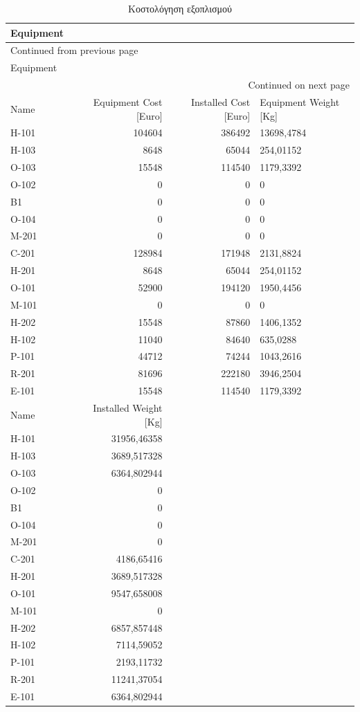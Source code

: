 \documentclass[11pt]{article}
\begin{document}
\begin{longtable}{lrrl}
\caption{Κοστολόγηση εξοπλισμού}
\\
Equipment &  &  & \\
\hline
\endfirsthead
\multicolumn{4}{l}{Continued from previous page} \\
\hline

Equipment &  &  &  \\

\hline
\endhead
\hline\multicolumn{4}{r}{Continued on next page} \\
\endfoot
\endlastfoot
\hline
Name & Equipment Cost [Euro] & Installed Cost [Euro] & Equipment Weight [Kg]\\
H-101 & 104604 & 386492 & 13698,4784\\
H-103 & 8648 & 65044 & 254,01152\\
O-103 & 15548 & 114540 & 1179,3392\\
O-102 & 0 & 0 & 0\\
B1 & 0 & 0 & 0\\
O-104 & 0 & 0 & 0\\
M-201 & 0 & 0 & 0\\
C-201 & 128984 & 171948 & 2131,8824\\
H-201 & 8648 & 65044 & 254,01152\\
O-101 & 52900 & 194120 & 1950,4456\\
M-101 & 0 & 0 & 0\\
H-202 & 15548 & 87860 & 1406,1352\\
H-102 & 11040 & 84640 & 635,0288\\
P-101 & 44712 & 74244 & 1043,2616\\
R-201 & 81696 & 222180 & 3946,2504\\
E-101 & 15548 & 114540 & 1179,3392\\
\hline
Name & Installed Weight [Kg] &  & \\
H-101 & 31956,46358 &  & \\
H-103 & 3689,517328 &  & \\
O-103 & 6364,802944 &  & \\
O-102 & 0 &  & \\
B1 & 0 &  & \\
O-104 & 0 &  & \\
M-201 & 0 &  & \\
C-201 & 4186,65416 &  & \\
H-201 & 3689,517328 &  & \\
O-101 & 9547,658008 &  & \\
M-101 & 0 &  & \\
H-202 & 6857,857448 &  & \\
H-102 & 7114,59052 &  & \\
P-101 & 2193,11732 &  & \\
R-201 & 11241,37054 &  & \\
E-101 & 6364,802944 &  & \\
\end{longtable}
\end{document}
